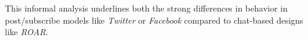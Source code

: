 This informal analysis underlines both the strong differences in behavior in post/subscribe models like \emph{Twitter} or \emph{Facebook} compared to chat-based designs like \emph{ROAR}.











